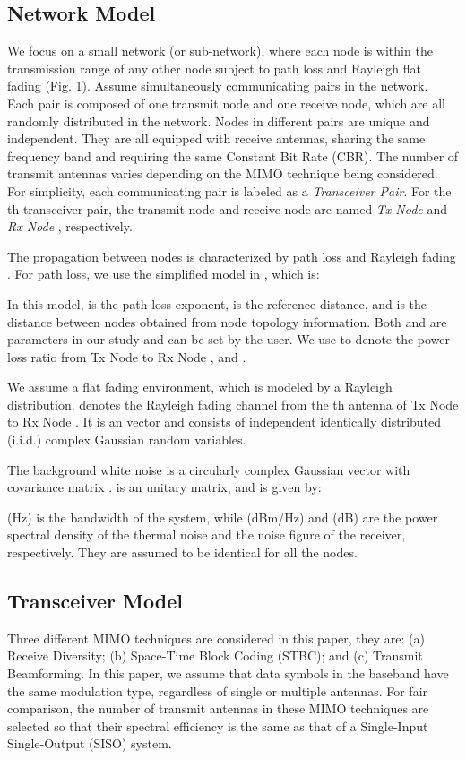 \documentclass[draftcls,onecolumn,peerview,12pt]{IEEEtran}
\begin{document}
\subsection{Network Model}
We focus on a small network (or sub-network), where each node is
within the transmission range of any other node subject to path loss
and Rayleigh flat fading (Fig. 1). Assume  simultaneously
communicating pairs in the network. Each pair is composed of one
transmit node and one receive node, which are all randomly
distributed in the network. Nodes in different pairs are unique and
independent. They are all equipped with  receive antennas,
sharing the same frequency band and requiring the same Constant Bit
Rate (CBR). The number of transmit antennas varies depending on the
MIMO technique being considered. For simplicity, each communicating
pair is labeled as a \textit{Transceiver Pair}. For the th
transceiver pair, the transmit node and receive node are named
\textit{Tx Node  } and \textit{Rx Node }, respectively.



The propagation between nodes is characterized by path loss and
Rayleigh fading \cite{10_rate_regions, 11_spatial_reuse,
12_Wireless_Rappaport}. For path loss, we use the simplified model
in \cite{12_Wireless_Rappaport}, which is:



In this model,  is the path loss exponent,  is the
reference distance, and  is the distance between nodes obtained
from node topology information. Both  and  are
parameters in our study and can be set by the user. We use
 to denote the power loss ratio from Tx Node  to Rx
Node , and .

We assume a flat fading environment, which is modeled by a Rayleigh
distribution.  denotes the Rayleigh fading
channel from the th antenna of Tx Node  to Rx Node . It is
an  vector and consists of independent identically
distributed (i.i.d.) complex Gaussian random variables.

The background white noise is a circularly complex Gaussian vector
with covariance matrix .
 is an  unitary matrix, and 
is given by:


(Hz) is the bandwidth of the system, while (dBm/Hz) and
(dB) are the power spectral density of the thermal noise and
the noise figure of the receiver, respectively. They are assumed to
be identical for all the nodes.

\subsection{Transceiver Model}
Three different MIMO techniques are considered in this paper, they
are: (a)  Receive Diversity; (b)  Space-Time
Block Coding (STBC); and (c)  Transmit Beamforming. In
this paper, we assume that data symbols in the baseband have the
same modulation type, regardless of single or multiple antennas. For
fair comparison, the number of transmit antennas in these MIMO
techniques are selected so that their spectral efficiency is the
same as that of a Single-Input Single-Output (SISO) system.
\end{document}
